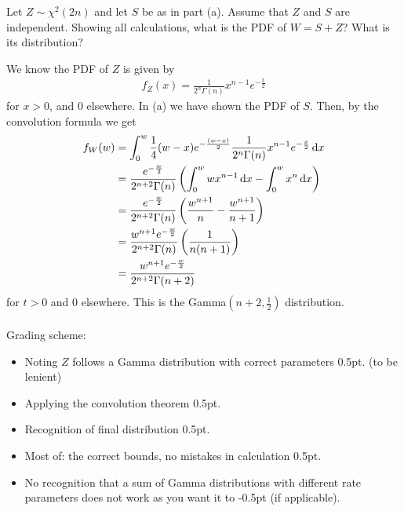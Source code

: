 \begin{exercise}[2]
Let $Z\sim\chi^2(2n)$ and let $S$ be as in part (a). Assume that $Z$ and $S$ are independent. Showing all calculations, what is the PDF of $W = S + Z$? What is its distribution?
\begin{solution}
We know the PDF of $Z$ is given by
\begin{align*}
    f_Z(x) = \frac{1}{2^n\Gamma(n)}x^{n-1}e^{-\frac{x}{2}}
\end{align*}
for $x>0$, and 0 elsewhere. In (a) we have shown the PDF of $S$. Then, by the convolution formula we get
\begin{align*}
    f_W(w) &= \int_0^w{\frac14 (w-x) e^{-\frac{(w-x)}{2}}\frac{1}{2^n\Gamma(n)}x^{n-1}e^{-\frac{x}{2}} \,\textrm{d}x}\\
    &=\frac{e^{-\frac{w}{2}}}{2^{n+2}\Gamma(n)}\left(\int_0^w{w x^{n-1} \,\textrm{d}x}-\int_0^w{ x^{n} \,\textrm{d}x}\right)\\
    &= \frac{e^{-\frac{w}{2}}}{2^{n+2}\Gamma(n)}\left(\frac{w^{n+1}}{n}-\frac{w^{n+1}}{n+1}\right)\\
    &= \frac{w^{n+1}e^{-\frac{w}{2}}}{2^{n+2}\Gamma(n)}\left(\frac{1}{n(n+1)}\right)\\
    &= \frac{w^{n+1}e^{-\frac{w}{2}}}{2^{n+2}\Gamma(n+2)}
\end{align*}
for $t>0$ and 0 elsewhere. This is the Gamma$\left(n+2,\frac12\right)$ distribution.
\\\\
Grading scheme:
\begin{itemize}
    \item Noting $Z$ follows a Gamma distribution with correct parameters 0.5pt. (to be lenient)
    \item Applying the convolution theorem 0.5pt.
    \item Recognition of final distribution 0.5pt.
    \item Most of: the correct bounds, no mistakes in calculation 0.5pt.
    \item No recognition that a sum of Gamma distributions with different rate parameters does not work as you want it to -0.5pt (if applicable).
\end{itemize}
\end{solution}
\end{exercise}
